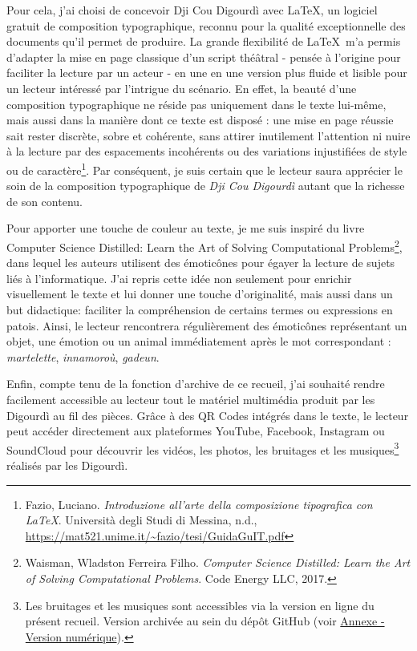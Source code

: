Pour cela, j'ai choisi de concevoir Dji Cou Digourdì avec \LaTeX, un logiciel gratuit de composition typographique, reconnu pour la qualité exceptionnelle des documents qu’il permet de produire. La grande flexibilité de \LaTeX\ m’a permis d’adapter la mise en page classique d’un script théâtral - pensée à l’origine pour faciliter la lecture par un acteur - en une en une version plus fluide et lisible pour un lecteur intéressé par l’intrigue du scénario. En effet, la beauté d’une composition typographique ne réside pas uniquement dans le texte lui-même, mais aussi dans la manière dont ce texte est disposé : une mise en page réussie sait rester discrète, sobre et cohérente, sans attirer inutilement l’attention ni nuire à la lecture par des espacements incohérents ou des variations injustifiées de style ou de caractère\footnote{ Fazio, Luciano. \textit{Introduzione all'arte della composizione tipografica con LaTeX}. Università degli Studi di Messina, n.d., \url{https://mat521.unime.it/~fazio/tesi/GuidaGuIT.pdf}}. Par conséquent, je suis certain que le lecteur saura apprécier le soin de la composition typographique de \textit{Dji Cou Digourdì} autant que la richesse de son contenu.

Pour apporter une touche de couleur au texte, je me suis inspiré du livre \og Computer Science Distilled: Learn the Art of Solving Computational Problems\fg\footnote{ Waisman, Wladston Ferreira Filho. \textit{Computer Science Distilled: Learn the Art of Solving Computational Problems}. Code Energy LLC, 2017.}, dans lequel les auteurs utilisent des émoticônes pour égayer la lecture de sujets liés à l'informatique. J'ai repris cette idée non seulement pour enrichir visuellement le texte et lui donner une touche d'originalité, mais aussi dans un but didactique: faciliter la compréhension de certains termes ou expressions en patois. Ainsi, le lecteur rencontrera régulièrement des émoticônes représentant un objet, une émotion ou un animal immédiatement après le mot correspondant : \textit{martelette}\martello, \textit{innamoroù}\inamourou, \textit{gadeun}\gadeun.

Enfin, compte tenu de la fonction d'archive de ce recueil, j'ai souhaité rendre facilement accessible au lecteur tout le matériel multimédia produit par les Digourdì au fil des pièces. Grâce à des QR Codes intégrés dans le texte, le lecteur peut accéder directement aux plateformes YouTube, Facebook, Instagram ou SoundCloud pour découvrir les vidéos, les photos, les bruitages et les musiques\footnote{ Les bruitages et les musiques sont accessibles via la version en ligne du présent recueil. Version archivée au sein du dépôt GitHub (voir \hyperref[vers_num]{Annexe - Version numérique}).} réalisés par les Digourdì.

